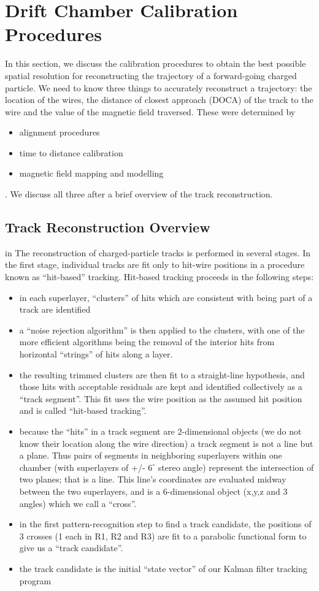 \section{Drift Chamber Calibration Procedures}
In this section, we discuss the calibration procedures to obtain the 
best possible spatial resolution for reconstructing the trajectory of
a forward-going charged particle.  We need to know three things to 
accurately reconstruct a trajectory: the location of the wires, the
distance of closest approach (DOCA) of the track to the wire and the
value of the magnetic field traversed.  These were determined by
\begin{itemize}
\item alignment procedures
\item time to distance calibration
\item magnetic field mapping and modelling
\end{itemize}.  We discuss all three after a brief overview of the track reconstruction.

\subsection{Track Reconstruction Overview}

 in
The reconstruction of charged-particle tracks is performed in several stages.  In 
the first stage, individual tracks are fit only to hit-wire positions in a 
procedure known as ``hit-based'' tracking.  Hit-based tracking proceeds
in the following steps:
\begin{itemize}
\item in each superlayer, ``clusters'' of hits which are consistent with
being part of a track are identified
\item a ``noise rejection algorithm'' is then applied to the clusters, 
with one of the more efficient algorithms being the removal of the
interior hits from horizontal ``strings'' of hits along a layer.
\item the resulting trimmed clusters are then fit to a straight-line hypothesis,
and those hits with acceptable residuals are kept and identified collectively
as a ``track segment''.  This fit uses the wire position as the assumed hit
position and is called ``hit-based tracking''.
\item because the ``hits'' in a track segment are 2-dimensional objects (we
do not know their location along the wire direction) a track segment is not
a line but a plane.  Thus pairs of segments in neighboring superlayers within
one chamber (with superlayers of +/- $6^\circ$ stereo angle) represent the
intersection of two planes; that is a line.  This line's coordinates 
are evaluated midway between the two superlayers, and is a 6-dimensional
object (x,y,z and 3 angles) which we call a ``cross''.
\item in the first pattern-recognition step to find a track candidate,
the positions of 3 crosses (1 each in R1, R2 and R3) are fit to a
parabolic functional form to give us a ``track candidate''.
\item the track candidate is the initial ``state vector'' of our
Kalman filter tracking program 
\end{itemize} 

